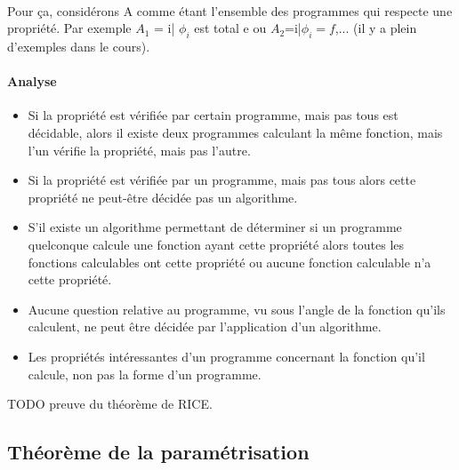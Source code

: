 \documentclass[11pt,a4paper]{article}
\begin{document}
\paragraph{}Pour ça, considérons A comme étant l'ensemble des programmes qui 
respecte une propriété. Par exemple $A_1$ = {i| $\phi_i$ est total e} ou 
$A_2$={i|$\phi_i = f$},... (il y a plein d'exemples dans le cours).

\paragraph{Analyse} 
\begin{itemize}
	\item Si la propriété est vérifiée par certain programme, mais pas tous 
		est décidable, alors il existe deux programmes calculant la 
		même fonction, mais l'un vérifie la propriété, mais pas l'autre.

	\item Si la propriété est vérifiée par un programme, mais pas tous 
		alors cette propriété ne peut-être décidée pas un algorithme.

	\item S'il existe un algorithme permettant de déterminer si un 
		programme quelconque calcule une fonction ayant cette propriété 
		alors toutes les fonctions calculables ont cette propriété ou 
		aucune fonction calculable n'a cette propriété.
	\item Aucune question relative au programme, vu sous l'angle de la 
		fonction qu'ils calculent, ne peut être décidée par 
		l'application d'un algorithme.
	\item Les propriétés intéressantes d'un programme concernant la 
		fonction qu'il calcule, non pas la forme d'un programme.
\end{itemize}

TODO preuve du théorème de RICE.


\subsection{Théorème de la paramétrisation}
\label{sub:th_or_me_de_la_param_trisation}






\end{document}
